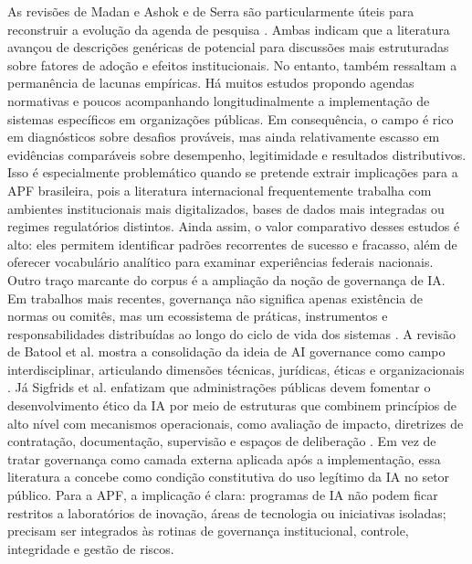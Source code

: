 \documentclass[12pt,a4paper]{article}
\begin{document}
As revisões de Madan e Ashok e de Serra são particularmente úteis para reconstruir a evolução da agenda de pesquisa \autocite{madan2022ai} \autocite{serra2024a}. Ambas indicam que a literatura avançou de descrições genéricas de potencial para discussões mais estruturadas sobre fatores de adoção e efeitos institucionais. No entanto, também ressaltam a permanência de lacunas empíricas. Há muitos estudos propondo agendas normativas e poucos acompanhando longitudinalmente a implementação de sistemas específicos em organizações públicas. Em consequência, o campo é rico em diagnósticos sobre desafios prováveis, mas ainda relativamente escasso em evidências comparáveis sobre desempenho, legitimidade e resultados distributivos. Isso é especialmente problemático quando se pretende extrair implicações para a APF brasileira, pois a literatura internacional frequentemente trabalha com ambientes institucionais mais digitalizados, bases de dados mais integradas ou regimes regulatórios distintos. Ainda assim, o valor comparativo desses estudos é alto: eles permitem identificar padrões recorrentes de sucesso e fracasso, além de oferecer vocabulário analítico para examinar experiências federais nacionais.
Outro traço marcante do corpus é a ampliação da noção de governança de IA. Em trabalhos mais recentes, governança não significa apenas existência de normas ou comitês, mas um ecossistema de práticas, instrumentos e responsabilidades distribuídas ao longo do ciclo de vida dos sistemas \autocite{batool2025ai} \autocite{sigfrids2022how}. A revisão de Batool et al. mostra a consolidação da ideia de AI governance como campo interdisciplinar, articulando dimensões técnicas, jurídicas, éticas e organizacionais \autocite{batool2025ai}. Já Sigfrids et al. enfatizam que administrações públicas devem fomentar o desenvolvimento ético da IA por meio de estruturas que combinem princípios de alto nível com mecanismos operacionais, como avaliação de impacto, diretrizes de contratação, documentação, supervisão e espaços de deliberação \autocite{sigfrids2022how}. Em vez de tratar governança como camada externa aplicada após a implementação, essa literatura a concebe como condição constitutiva do uso legítimo da IA no setor público. Para a APF, a implicação é clara: programas de IA não podem ficar restritos a laboratórios de inovação, áreas de tecnologia ou iniciativas isoladas; precisam ser integrados às rotinas de governança institucional, controle, integridade e gestão de riscos.
\end{document}
